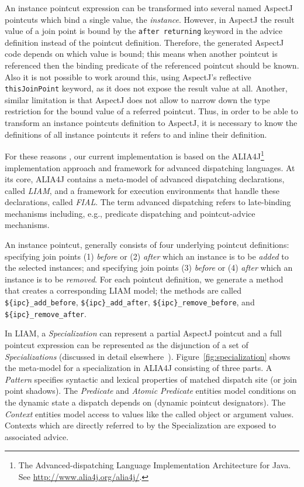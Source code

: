 \documentclass{acm_proc_article-sp}
\begin{document}
An instance pointcut expression can be transformed into several named AspectJ pointcuts which bind a single value, the \emph{instance}.
However, in AspectJ the result value of a join point is bound by the \lstinline{after returning} keyword in the advice definition instead of the pointcut definition.
Therefore, the generated AspectJ code depends on which value is bound; this means when another pointcut is referenced then the binding predicate of the referenced pointcut should be known.
Also it is not possible to work around this, using AspectJ's reflective \lstinline{thisJoinPoint} keyword, as it does not expose the result value at all.
Another, similar limitation is that AspectJ does not allow to narrow down the type restriction for the bound value of a referred pointcut.
Thus, in order to be able to transform an instance pointcuts definition to AspectJ, it is necessary to know the definitions of all instance pointcuts it refers to and inline their definition.

For these reasons , our current implementation is based on the ALIA4J\footnote{The Advanced-dispatching Language Implementation Architecture for Java. See \url{http://www.alia4j.org/alia4j/}.}~\cite{Bockisch2012,Bockisch2011} implementation approach and framework for advanced dispatching languages.
At its core, ALIA4J contains a meta-model of advanced dispatching declarations, called \emph{LIAM}, and a framework for execution environments that handle these declarations, called \emph{FIAL}.
The term advanced dispatching refers to late-binding mechanisms including, e.g., predicate dispatching and pointcut-advice mechanisms.

An instance pointcut, generally consists of four underlying pointcut definitions: specifying join points (1) \emph{before} or (2) \emph{after} which an instance is to be \emph{added} to the selected instances; and specifying join points (3) \emph{before} or (4) \emph{after} which an instance is to be \emph{removed}.
For each pointcut definition, we generate a method that creates a corresponding LIAM model; the methods are called \lstinline!${ipc}_add_before!, \lstinline!${ipc}_add_after!, \lstinline!${ipc}_remove_before!, and \lstinline!${ipc}_remove_after!.

In LIAM, a \emph{Specialization} can represent a partial AspectJ pointcut and a full pointcut expression can be represented as the disjunction of a set of \emph{Specializations} (discussed in detail elsewhere~\cite{Bockisch2007}). 
Figure~\ref{fig:specialization} shows the meta-model for a specialization in ALIA4J consisting of three parts.
A \emph{Pattern} specifies syntactic and lexical properties of matched dispatch site (or join point shadows).
The \emph{Predicate} and \emph{Atomic Predicate} entities model conditions on the dynamic state a dispatch depends on (dynamic pointcut designators).
The \emph{Context} entities model access to values like the called object or argument values.
Contexts which are directly referred to by the Specialization are exposed to associated advice.
\end{document}
